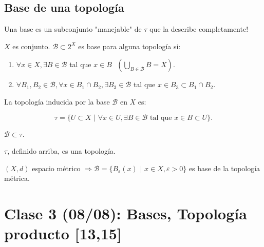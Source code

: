 \documentclass[a4paper]{report}
\begin{document}
	\subsection{Base de una topología}

	Una base es un subconjunto "manejable" de $\tau$ que la describe completamente!

	\begin{definition}[base]
		$X$ es conjunto. $\mathcal{B} \subset 2^X$ es base para alguna topología si:
		\begin{enumerate}
			\item $\forall x \in X, \exists B \in \mathcal{B}$ tal que $x \in B \text{ } \left( \bigcup_{B \in \mathcal{B}} B = X \right)$.

			\item $\forall B_1, B_2 \in \mathcal{B}, \forall x \in B_1 \cap B_2, \exists B_3 \in \mathcal{B}$ tal que $x \in B_3 \subset B_1 \cap B_2$.
		\end{enumerate}
	\end{definition}

	\begin{definition}
		La topología inducida por la base $\mathcal{B}$ en $X$ es:

		\[
		\tau = \{ U \subset X \text{ | } \forall x \in U, \exists B \in \mathcal{B} \text{ tal que } x \in B \subset U \}.
		\]
	\end{definition}

	\begin{note}
		$\mathcal{B} \subset \tau$.
	\end{note}

	\begin{lemma}
		$\tau$, definido arriba, es una topología.
	\end{lemma}

	\begin{eg}
		$(X,d)$ espacio métrico $\Rightarrow \mathcal{B} = \{ B_{\varepsilon} (x) \text{ | } x \in X, \varepsilon > 0 \}$ es base de la topología métrica.
	\end{eg}

	\section{Clase 3 (08/08): Bases, Topología producto [13,15]}
\end{document}

